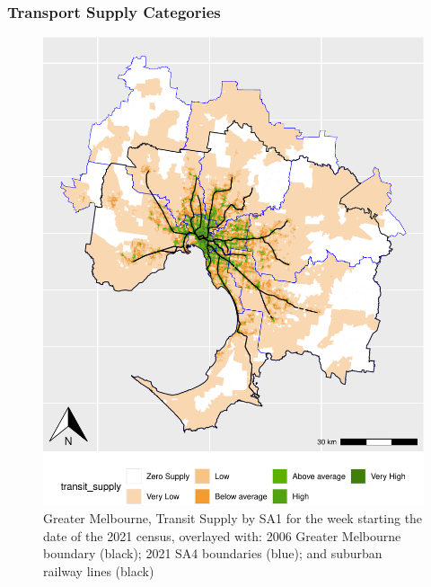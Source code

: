 \documentclass[preprint, 3p,
authoryear]{elsarticle} %
\begin{document}
\subsubsection{Transport Supply
Categories}\label{transport-supply-categories}

\begin{figure}
\centering
\includegraphics{Leveraging_GTFS_to_assess_transit_supply_Transport_Geography_files/figure-latex/Greater_Melbourne_2021_SA1_plot-1.pdf}
\caption{Greater Melbourne, Transit Supply by SA1 for the week starting
the date of the 2021 census, overlayed with: 2006 Greater Melbourne
boundary (black); 2021 SA4 boundaries (blue); and suburban railway lines
(black)}
\end{figure}
\end{document}
